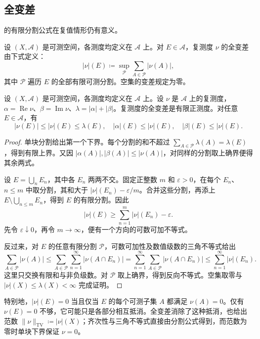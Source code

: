 \subsection{全变差}
\label{b1:subsec:060502}

的有限分割公式在复值情形仍有意义。

\begin{definition}\label{b1:def:complex-total-variation}
设 \((X,\mathcal A)\) 是可测空间，各测度均定义在 \(\mathcal A\) 上。对 \(E\in\mathcal A\)，复测度 \(\nu\) 的全变差由下式定义：
\[
|\nu|(E)\coloneqq\sup_{\mathcal P}\sum_{A\in\mathcal P}|\nu(A)|,
\]
其中 \(\mathcal P\) 遍历 \(E\) 的全部有限可测分割。空集的变差规定为零。
\end{definition}

\begin{proposition}\label{b1:prop:complex-variation-measure}
设 \((X,\mathcal A)\) 是可测空间，各测度均定义在 \(\mathcal A\) 上。设 \(\nu\) 是 \(\mathcal A\) 上的复测度，\(\alpha=\operatorname{Re}\nu\)、\(\beta=\operatorname{Im}\nu\)、\(\lambda=|\alpha|+|\beta|\)。复测度的全变差是有限正测度。对任意 \(E\in\mathcal A\)，有
\[
|\nu(E)|\leq|\nu|(E)\leq\lambda(E),\quad
|\alpha|(E)\leq|\nu|(E),\quad
|\beta|(E)\leq|\nu|(E).
\]
\end{proposition}
\begin{proof}
单块分割给出第一个下界。每个分割的和不超过 \(\sum_{A\in\mathcal P}\lambda(A)=\lambda(E)\)，得到有限上界。又因 \(|\alpha(A)|,|\beta(A)|\leq|\nu(A)|\)，对同样的分割取上确界便得其余两式。

设 \(E=\bigcup_nE_n\)，其中各 \(E_n\) 两两不交。固定正整数 \(m\) 和 \(\varepsilon>0\)，在每个 \(E_n\)、\(n\leq m\) 中取分割，其和大于 \(|\nu|(E_n)-\varepsilon/m\)。合并这些分割，再添上 \(E\setminus\bigcup_{n\leq m}E_n\)，得到 \(E\) 的有限分割。因此
\[
|\nu|(E)\geq\sum_{n=1}^{m}|\nu|(E_n)-\varepsilon.
\]
先令 \(\varepsilon\downarrow0\)，再令 \(m\to\infty\)，便有一个方向的可数可加不等式。

反过来，对 \(E\) 的任意有限分割 \(\mathcal P\)，可数可加性及数值级数的三角不等式给出
\[
\sum_{A\in\mathcal P}|\nu(A)|
\leq\sum_{A\in\mathcal P}\sum_{n=1}^{\infty}|\nu(A\cap E_n)|
=\sum_{n=1}^{\infty}\sum_{A\in\mathcal P}|\nu(A\cap E_n)|
\leq\sum_{n=1}^{\infty}|\nu|(E_n).
\]
这里只交换有限和与非负级数。对 \(\mathcal P\) 取上确界，得到反向不等式。空集取零与 \(|\nu|(X)\leq\lambda(X)<\infty\) 完成证明。
\end{proof}

特别地，\(|\nu|(E)=0\) 当且仅当 \(E\) 的每个可测子集 \(A\) 都满足 \(\nu(A)=0\)。仅有 \(\nu(E)=0\) 不够，它可能只是各部分相互抵消。全变差消除了这种抵消，也给出范数 \(\|\nu\|_{\mathrm{TV}}\coloneqq|\nu|(X)\)；齐次性与三角不等式直接由分割公式得到，而范数为零时单块下界保证 \(\nu=0\)。

